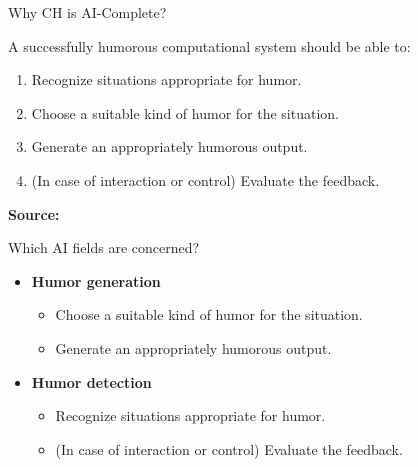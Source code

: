 \begin{frame}[t]{Why CH is AI-Complete?}
\begin{large}
A successfully humorous computational system should be able to:
\begin{enumerate}
  \item Recognize situa­tions appropriate for humor.
  \item Choose a suitable kind of humor for the situation.
  \item Generate an appropriately humorous output.
  \item (In case of interaction or control) Evaluate the feedback.  
\end{enumerate}
\end{large}
\vskip75pt
\small \textbf{Source:}  \cite{stock2003getting}
\end{frame}

\begin{frame}[t]{Which AI fields are concerned?}
\vskip15pt
\begin{Large}
\begin{itemize}
  \item \textbf{Humor generation} 
  \begin{itemize}
    \item Choose a suitable kind of humor for the situation.
    \item Generate an appropriately humorous output. 
  \end{itemize}
\end{itemize}
\vskip20pt
\begin{itemize}
  \item \textbf{Humor detection} 
  \begin{itemize}
    \item Recognize situa­tions appropriate for humor.
    \item (In case of interaction or control) Evaluate the feedback. 
  \end{itemize}  
\end{itemize}

\end{Large}
  \note{}
\end{frame}

